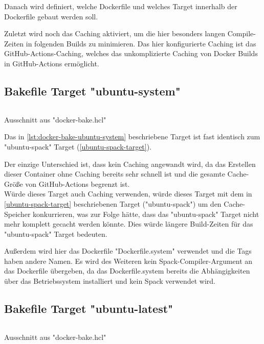 Danach wird definiert, welche Dockerfile und welches Target innerhalb der Dockerfile gebaut werden soll. 

Zuletzt wird noch das Caching aktiviert, um die hier besonders langen Compile-Zeiten in folgenden Builds zu minimieren. Das hier konfigurierte Caching ist das GitHub-Actions-Caching, welches das unkomplizierte Caching von Docker Builds in GitHub-Actions ermöglicht.

\subsection{Bakefile Target "ubuntu-system"} \label{ubuntu-system-target}

\begin{listing}[H]
    \inputminted[firstline=30,lastline=44]{./lexers/docker-bake-lexer.py}{./code-examples/docker-bake.hcl}
    \caption{Ausschnitt aus "docker-bake.hcl"}
    \label{lst:docker-bake-ubuntu-system}
\end{listing}

Das in \cref{lst:docker-bake-ubuntu-system} beschriebene Target ist fast identisch zum "ubuntu-spack" Target (\cref{ubuntu-spack-target}). 

Der einzige Unterschied ist, dass kein Caching angewandt wird, da das Erstellen dieser Container ohne Caching bereits sehr schnell ist und die gesamte Cache-Größe von GitHub-Actions begrenzt ist. \\
Würde dieses Target auch Caching verwenden, würde dieses Target mit dem in \cref{ubuntu-spack-target} beschriebenen Target ("ubuntu-spack") um den Cache-Speicher konkurrieren, was zur Folge hätte, dass das "ubuntu-spack" Target nicht mehr komplett gecacht werden könnte. Dies würde längere Build-Zeiten für das "ubuntu-spack" Target bedeuten.

Außerdem wird hier das Dockerfile "Dockerfile.system" verwendet und die Tags haben andere Namen. Es wird des Weiteren kein Spack-Compiler-Argument an das Dockerfile übergeben, da das Dockerfile.system bereits die Abhängigkeiten über das Betriebssystem installiert und kein Spack verwendet wird. 


\subsection{Bakefile Target "ubuntu-latest"}

\begin{listing}[H]
    \inputminted[firstline=47,lastline=56]{./lexers/docker-bake-lexer.py}{./code-examples/docker-bake.hcl}
    \caption{Ausschnitt aus "docker-bake.hcl"}
    \label{lst:docker-bake-ubuntu-latest}
\end{listing}


